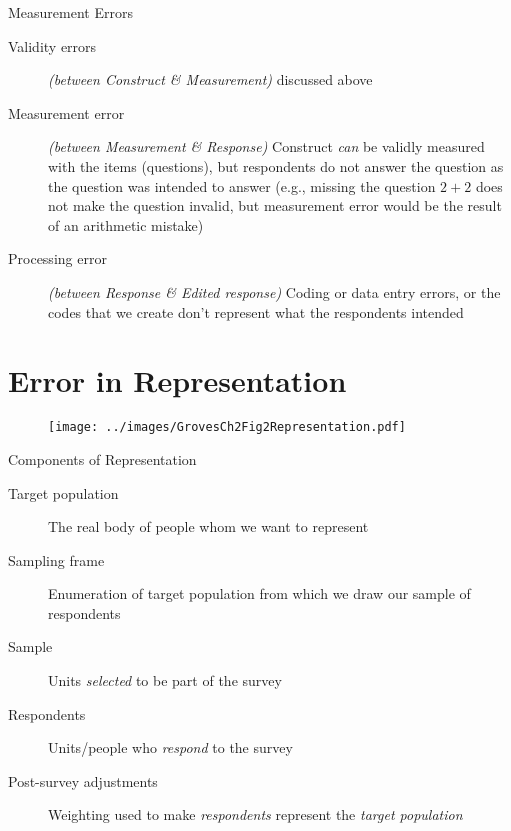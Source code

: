 \documentclass[]{beamer}
\begin{document}
\begin{frame}{Measurement Errors}
\begin{description}
\item[Validity errors] \textit{(between Construct \& Measurement)} discussed above
\item[Measurement error] \textit{(between Measurement \& Response)} Construct \emph{can} be validly measured with the items (questions), but respondents do not answer the question as the question was intended to answer (e.g., missing the question $2+2$ does not make the question invalid, but measurement error would be the result of an arithmetic mistake)
\item[Processing error] \textit{(between Response \& Edited response)} Coding or data entry errors, or the codes that we create don't represent what the respondents intended
\end{description}
\end{frame}

\section{Error in Representation}

\begin{frame}
\begin{figure}[h!]
\begin{center}
\texttt{[image: ../images/GrovesCh2Fig2Representation.pdf]}
\end{center}
\end{figure}
\end{frame}

\begin{frame}{Components of Representation}
\begin{description}
\item[Target population] The real body of people whom we want to represent \pause
\item[Sampling frame] Enumeration of target population from which we draw our sample of respondents \pause
\item[Sample] Units \emph{selected} to be part of the survey \pause
\item[Respondents] Units\slash people who \emph{respond} to the survey \pause
\item[Post-survey adjustments] Weighting used to make \emph{respondents} represent the \emph{target population} 
\end{description}
\end{frame}
\end{document}

